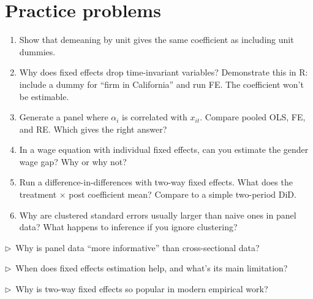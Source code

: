 \section{Practice problems}

\begin{enumerate}
  \item Show that demeaning by unit gives the same coefficient as including unit dummies.
  \item Why does fixed effects drop time-invariant variables? Demonstrate this in R: include a dummy for ``firm in California'' and run FE. The coefficient won't be estimable.
  \item Generate a panel where $\alpha_i$ is correlated with $x_{it}$. Compare pooled OLS, FE, and RE. Which gives the right answer?
  \item In a wage equation with individual fixed effects, can you estimate the gender wage gap? Why or why not?
  \item Run a difference-in-differences with two-way fixed effects. What does the treatment $\times$ post coefficient mean? Compare to a simple two-period DiD.
  \item Why are clustered standard errors usually larger than naive ones in panel data? What happens to inference if you ignore clustering?
\end{enumerate}

\begin{reflect}
$\triangleright$~Why is panel data ``more informative'' than cross-sectional data?

\smallskip
$\triangleright$~When does fixed effects estimation help, and what's its main limitation?

\smallskip
$\triangleright$~Why is two-way fixed effects so popular in modern empirical work?
\end{reflect}
